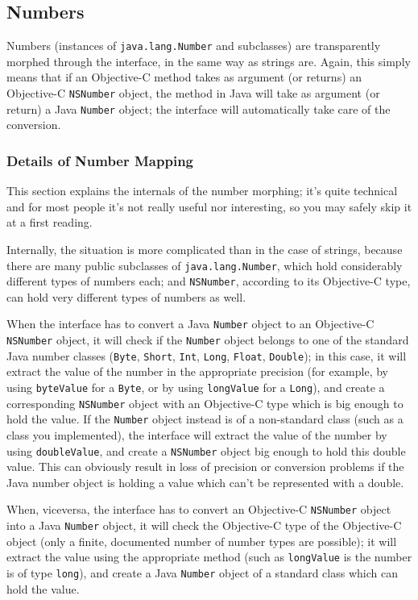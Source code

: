 \subsection{Numbers}

Numbers (instances of \texttt{java.lang.Number} and subclasses) are
transparently morphed through the interface, in the same way as
strings are.  Again, this simply means that if an Objective-C method
takes as argument (or returns) an Objective-C \texttt{NSNumber}
object, the method in Java will take as argument (or return) a Java
\texttt{Number} object; the interface will automatically take care of
the conversion.

\subsubsection{Details of Number Mapping}

This section explains the internals of the number morphing; it's quite
technical and for most people it's not really useful nor interesting,
so you may safely skip it at a first reading.

Internally, the situation is more complicated than in the case of
strings, because there are many public subclasses of
\texttt{java.lang.Number}, which hold considerably different types of
numbers each; and \texttt{NSNumber}, according to its Objective-C
type, can hold very different types of numbers as well.  

When the interface has to convert a Java \texttt{Number} object to an
Objective-C \texttt{NSNumber} object, it will check if the
\texttt{Number} object belongs to one of the standard Java number
classes (\texttt{Byte}, \texttt{Short}, \texttt{Int}, \texttt{Long},
\texttt{Float}, \texttt{Double}); in this case, it will extract the
value of the number in the appropriate precision (for example, by
using \texttt{byteValue} for a \texttt{Byte}, or by using
\texttt{longValue} for a \texttt{Long}), and create a corresponding
\texttt{NSNumber} object with an Objective-C type which is big enough
to hold the value.  If the \texttt{Number} object instead is of a
non-standard class (such as a class you implemented), the interface
will extract the value of the number by using \texttt{doubleValue},
and create a \texttt{NSNumber} object big enough to hold this double
value.  This can obviously result in loss of precision or conversion
problems if the Java number object is holding a value which can't be
represented with a double.

When, viceversa, the interface has to convert an Objective-C
\texttt{NSNumber} object into a Java \texttt{Number} object, it will
check the Objective-C type of the Objective-C object (only a finite,
documented number of number types are possible); it will extract the
value using the appropriate method (such as \texttt{longValue} is the
number is of type \texttt{long}), and create a Java \texttt{Number}
object of a standard class which can hold the value.

